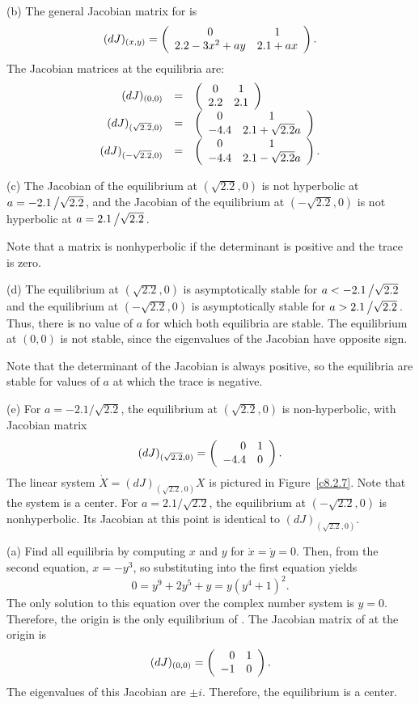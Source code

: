 \documentclass{ximera}
\begin{document}
(b) The general Jacobian matrix for  is
\[
(dJ)_{(x,y)} = \left(\begin{array}{cc} 0 & 1\\ 2.2 - 3x^2 + ay &2.1 + ax\end{array}\right).
\]
The Jacobian matrices at the equilibria are:
\[ \begin{array}{rcl}
(dJ)_{(0,0)} & = & \left(\begin{array}{cc} 0 & 1\\ 2.2 &2.1\end{array}\right) \\
(dJ)_{(\sqrt{2.2},0)} & = & \left(\begin{array}{cc} 0 & 1\\ -4.4 &2.1 + \sqrt{2.2}a\end{array}\right) \\
(dJ)_{(-\sqrt{2.2},0)} & = & \left(\begin{array}{cc} 0 & 1\\ -4.4 &2.1 - \sqrt{2.2}a\end{array}\right). \\
\end{array}
\]

(c) \ans The Jacobian of the equilibrium at $(\sqrt{2.2},0)$ is not
hyperbolic at $a = -2.1\left/\sqrt{2.2}\right.$, and the Jacobian of the
equilibrium at $(-\sqrt{2.2},0)$ is not hyperbolic at
$a = 2.1\left/\sqrt{2.2}\right.$.

\soln Note that a matrix is nonhyperbolic if the determinant is positive
and the trace is zero.

(d) \ans The equilibrium at $(\sqrt{2.2},0)$ is asymptotically stable for
$a < -2.1\left/\sqrt{2.2}\right.$ and the equilibrium at
$(-\sqrt{2.2},0)$ is asymptotically stable for
$a > 2.1\left/\sqrt{2.2}\right.$.  Thus, there is no value of $a$ for which
both equilibria are stable.  The equilibrium at $(0,0)$ is not stable,
since the eigenvalues of the Jacobian have opposite sign.

\soln Note that the determinant of the Jacobian is always positive, so
the equilibria are stable for values of $a$ at which the trace is negative.

(e) For $a = -2.1/\sqrt{2.2}$, the equilibrium at $(\sqrt{2.2},0)$
is non-hyperbolic, with Jacobian matrix
\[
(dJ)_{(\sqrt{2.2},0)} = \left(\begin{array}{rr} 0 & 1\\ -4.4 &0\end{array}\right).
\]
The linear system $\dot{X} = (dJ)_{(\sqrt{2.2},0)}X$ is pictured in
Figure~\ref{c8.2.7}.  Note that the system is a center.  For
$a = 2.1/\sqrt{2.2}$, the equilibrium at $(-\sqrt{2.2},0)$ is
nonhyperbolic.  Its Jacobian at this point is identical to
$(dJ)_{(\sqrt{2.2},0)}$.

\begin{figure}[htb]
                       \centerline{%
                       }
\end{figure}

(a) Find all equilibria by computing $x$ and $y$ for $\dot{x} =
\dot{y} = 0$.  Then, from the second equation, $x = -y^3$, so
substituting into the first equation yields
\[
0 = y^9 + 2y^5 + y = y(y^4 + 1)^2.
\]
The only solution to this equation over the complex number system is
$y = 0$.  Therefore, the origin is the only equilibrium of
.  The Jacobian matrix of  at
the origin is 
\[
(dJ)_{(0,0)} = \left(\begin{array}{rr} 0 & 1\\ -1 &0\end{array}\right).
\]
The eigenvalues of this Jacobian are $\pm i$.  Therefore, the equilibrium
is a center.
\end{document}
